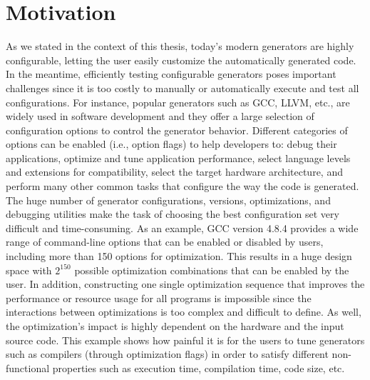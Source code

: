 \section{Motivation}


As we stated in the context of this thesis, today's modern generators are highly configurable, letting the user easily customize the automatically generated code. In the meantime, efficiently testing configurable generators poses important challenges since it is too costly to manually or automatically execute and test all configurations. 
For instance, popular generators such as GCC, LLVM, etc., are widely used in software development and they
offer a large selection of configuration options to control the generator behavior. 
Different categories of options can be enabled (i.e., option flags) to help developers to: debug their applications, optimize and tune application performance, select language levels and extensions for compatibility, select the target hardware architecture, and perform many other common tasks that configure the way the code is generated.
The huge number of generator configurations, versions, optimizations, and debugging utilities make the task of choosing the best configuration set very difficult and time-consuming. As an example, GCC version 4.8.4 provides a wide range of command-line options that can be enabled or disabled by users, including more than 150 options for optimization. This results in a huge design space with $2^{150}$ possible optimization combinations that can be enabled by the user. In addition, constructing one single optimization sequence that improves the performance or resource usage for all programs is impossible since the interactions between optimizations is too complex and difficult to define. As well, the optimization's impact is highly dependent on the hardware and the input source code.
This example shows how painful it is for the users to tune generators such as compilers (through optimization flags) in order to satisfy different non-functional properties such as execution time, compilation time, code size, etc.

